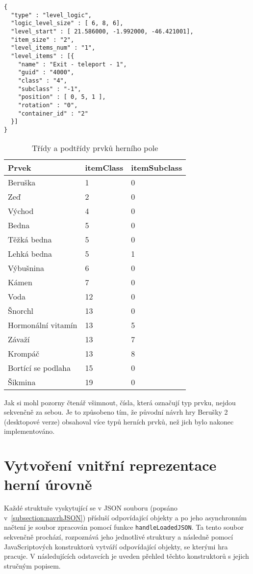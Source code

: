 \label{code:jsonLogic}
\begin{lstlisting}
{
  "type" : "level_logic",
  "logic_level_size" : [ 6, 8, 6],
  "level_start" : [ 21.586000, -1.992000, -46.421001],
  "item_size" : "2",
  "level_items_num" : "1",
  "level_items" : [{
    "name" : "Exit - teleport - 1",
    "guid" : "4000",
    "class" : "4",
    "subclass" : "-1",
    "position" : [ 0, 5, 1 ],
    "rotation" : "0",
    "container_id" : "2"
  }]
}
\end{lstlisting}

\begin{table}
\label{table:itemClass}
\begin{center}
\begin{tabular}{ | l | l | l |}
\hline
\textbf{Prvek} & \textbf{itemClass} & \textbf{itemSubclass} \\ \hline
Beruška & 1 & 0 \\ \hline
Zeď & 2 & 0 \\ \hline
Východ & 4 & 0 \\ \hline
Bedna & 5 & 0 \\ \hline
Těžká bedna & 5 & 0 \\ \hline
Lehká bedna & 5 & 1 \\ \hline
Výbušnina & 6 & 0 \\ \hline
Kámen & 7 & 0 \\ \hline
Voda & 12 & 0 \\ \hline
Šnorchl & 13 & 0 \\ \hline
Hormonální vitamín & 13 & 5 \\ \hline
Závaží & 13 & 7 \\ \hline
Krompáč & 13 & 8 \\ \hline
Bortící se podlaha & 15 & 0 \\ \hline
Šikmina & 19 & 0 \\ \hline
\end{tabular}
\end{center}
\caption{Třídy a podtřídy prvků herního pole}
\end{table}

Jak si mohl pozorny čtenář všimnout, čísla, která označují typ prvku, nejdou sekvenčně za sebou. Je to způsobeno tím, že původní návrh hry Berušky 2 (desktopové verze) obsahoval více typů herních prvků, než jich bylo nakonec implementováno. 

\section{Vytvoření vnitřní reprezentace herní úrovně}
Každé struktuře vyskytující se v JSON souboru (popsáno v~\ref{subsection:navrhJSON}) přísluší odpovídající objekty a po jeho asynchronním načtení je soubor zpracován pomocí funkce \texttt{handleLoadedJSON}. Ta tento soubor sekvenčně prochází, rozpoznává jeho jednotlivé struktury a následně pomocí JavaScriptových konstruktorů vytváří odpovídající objekty, se kterými hra pracuje. V následujících odstavcích je uveden přehled těchto konstruktorů s jejich stručným popisem.


